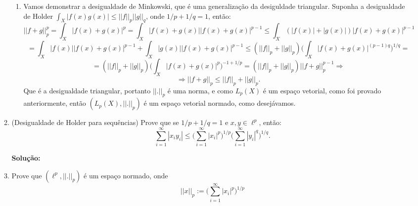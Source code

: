 \documentclass{article}
\begin{document}
\begin{enumerate}
\begin{enumerate}
\begin{enumerate}
						\item Vamos demonstrar a desigualdade de Minkowski, que é uma generalização da desiguldade triangular. Suponha a desigualdade de Holder $\int_{X} |f(x) g(x)| \leq ||f||_{p} ||g||_{q}$, onde $1/p + 1/q = 1$, então:
						$$
						||f+g||_{p}^{p} =\int_{X} |f(x) + g(x)|^{p} = \int_{X} |f(x) + g(x)||f(x) + g(x)|^{p-1} \leq \int_{X} (|f(x)| + |g(x)|)|f(x) + g(x)|^{p-1}
						$$
						$$
						 = \int_{X} |f(x)||f(x) + g(x)|^{p-1} + \int_{X}|g(x)||f(x) + g(x)|^{p-1} \leq (||f||_{p} + ||g||_{p})\Big( \int_{X} |f(x) + g(x)|^{(p-1)q} \Big)^{1/q} = 
						$$
						$$
						=(||f||_{p} + ||g||_{p})\Big( \int_{X} |f(x) + g(x)|^{p} \Big)^{-1+1/p} = (||f||_{p} + ||g||_{p})||f + g||_{p}^{p-1} \Rightarrow
						$$
						$$
						\Rightarrow ||f+g||_{p} \leq ||f||_{p} + ||g||_{p}. 
						$$
						Que é a desigualdade triangular, portanto $||.||_{p}$ é uma norma, e como $L_{p}(X)$ é um espaço vetorial, como foi provado anteriormente, então $(L_{p}(X), ||.||_{p})$ é um espaço vetorial normado, como desejávamos.
					\end{enumerate}
					
				\item (Desigualdade de Holder para sequências) Prove que se $1/p + 1/q = 1$ e $x, y \in \ell^{p}$, então:
				$$
				\sum \limits_{i=1}^{\infty} |x_{i}y_{i}| \leq \Big(\sum \limits_{i=1}^{\infty} |x_{i}|^{p}\Big)^{1/p} \Big(\sum \limits_{i=1}^{\infty}|y_{i}|^{q}\Big)^{1/q}.
				$$
				
				\textbf{Solução:}
				
				\item Prove que $(\ell^{p}, ||.||_p)$ é um espaço normado, onde
				$$
				||x||_{p} := \Big(\sum \limits_{i=1}^{\infty} |x_{i}|^{p}\Big)^{1/p}
				$$
				

\end{enumerate}
\end{enumerate}
\end{document}
